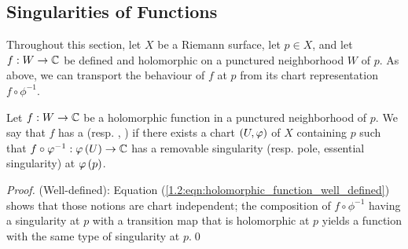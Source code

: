 \documentclass[../Moduli_Spaces_of_Riemann_Surfaces.tex]{subfiles}
\begin{document}
    \subsection{Singularities of Functions}
    Throughout this section, let $X$ be a Riemann surface, let $p\in X$, and let $f:W\to\mathbb{C}$ be defined and holomorphic on a punctured neighborhood $W$ of $p$. As above, we can transport the behaviour of $f$ at $p$ from its chart representation $f\circ\phi^{-1}$.
    \begin{definition}
        Let $f:W\to\mathbb{C}$ be a holomorphic function in a punctured neighborhood of $p$. We say that $f$ has a  (resp. , )  if there exists a chart $\left(U,\varphi\right)$ of $X$ containing $p$ such that $f\circ\varphi^{-1}:\varphi\left(U\right)\to\mathbb{C}$ has a removable singularity (resp. pole, essential singularity) at $\varphi\left(p\right)$.
    \end{definition}
    \vspace{-0.05in}
    \begin{proof}
        (Well-defined): Equation (\ref{1.2:eqn:holomorphic_function_well_defined}) shows that those notions are chart independent; the composition of $f\circ\phi^{-1}$ having a singularity at $p$ with a transition map that is holomorphic at $p$ yields a function with the same type of singularity at $p$.\qed
    \end{proof}
\end{document}
